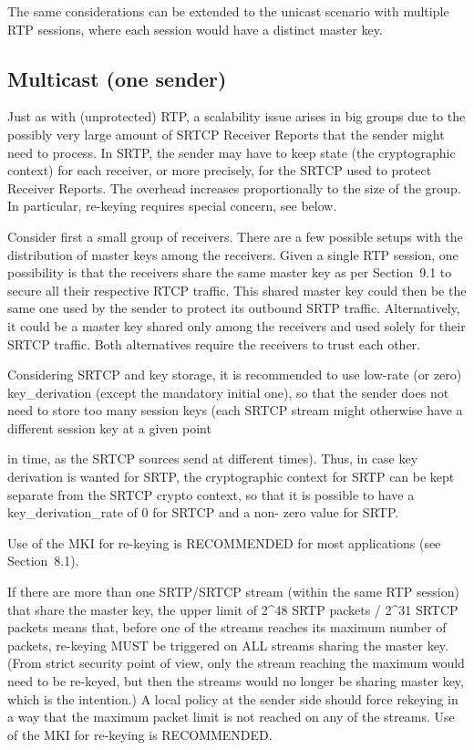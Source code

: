 \documentclass{article}
\begin{document}
The same considerations can be extended to the unicast scenario with multiple RTP sessions, where each session would have a distinct master key.

\subsection{Multicast (one sender)}

Just as with (unprotected) RTP, a scalability issue arises in big groups due to the possibly very large amount of SRTCP Receiver Reports that the sender might need to process.  In SRTP, the sender may have to keep state (the cryptographic context) for each receiver, or more precisely, for the SRTCP used to protect Receiver Reports. The overhead increases proportionally to the size of the group.  In particular, re-keying requires special concern, see below.

Consider first a small group of receivers.  There are a few possible setups with the distribution of master keys among the receivers. Given a single RTP session, one possibility is that the receivers share the same master key as per Section~9.1 to secure all their respective RTCP traffic.  This shared master key could then be the same one used by the sender to protect its outbound SRTP traffic. Alternatively, it could be a master key shared only among the receivers and used solely for their SRTCP traffic.  Both alternatives require the receivers to trust each other.

Considering SRTCP and key storage, it is recommended to use low-rate (or zero) key\_derivation (except the mandatory initial one), so that the sender does not need to store too many session keys (each SRTCP stream might otherwise have a different session key at a given point

in time, as the SRTCP sources send at different times).  Thus, in case key derivation is wanted for SRTP, the cryptographic context for SRTP can be kept separate from the SRTCP crypto context, so that it is possible to have a key\_derivation\_rate of 0 for SRTCP and a non- zero value for SRTP.

Use of the MKI for re-keying is RECOMMENDED for most applications (see Section~8.1).

If there are more than one SRTP/SRTCP stream (within the same RTP session) that share the master key, the upper limit of 2\textasciicircum{}48 SRTP packets / 2\textasciicircum{}31 SRTCP packets means that, before one of the streams reaches its maximum number of packets, re-keying MUST be triggered on ALL streams sharing the master key.  (From strict security point of view, only the stream reaching the maximum would need to be re-keyed, but then the streams would no longer be sharing master key, which is the intention.)  A local policy at the sender side should force rekeying in a way that the maximum packet limit is not reached on any of the streams.  Use of the MKI for re-keying is RECOMMENDED.
\end{document}

